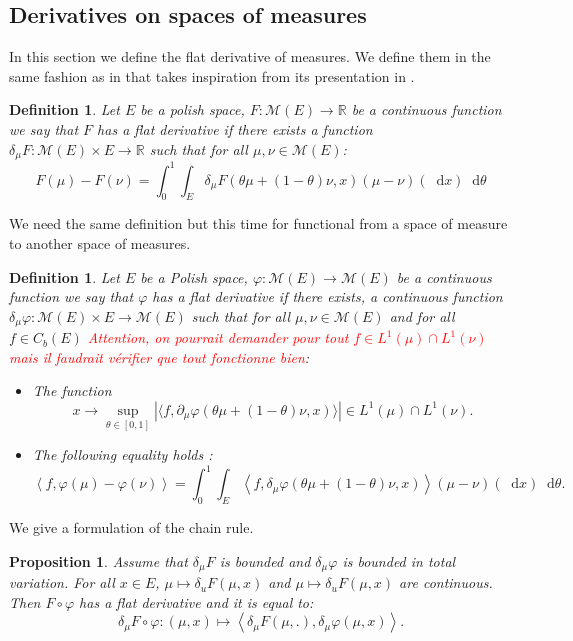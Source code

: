 \documentclass[11pt,a4paper]{article}
\newcommand{\RR}{\mathbb{R}}
\newcommand{\MC}{\mathcal{M}}
\newcommand{\red}[1]{\textcolor{red}{#1}}
\newcommand{\brac}[1]{\left\langle#1\right\rangle}
\newcommand{\dd}{\mathop{}\!\mathrm{d}}
\newtheorem{proposition}[theorem]{Proposition}
\newtheorem{definition}[theorem]{Definition}
\begin{document}
\subsection{Derivatives on spaces of measures}
In this section we define the flat derivative of measures. We define them in the same fashion as in \cite{martiniKolmogorovEquationsSpaces2023} that takes inspiration from its presentation in \cite{cardaliaguet2019master,carmona2018probabilistic}.
\begin{definition}
    Let $E$ be a polish space, $F: \MC(E) \to \RR$ be a continuous function we say that $F$ has a flat derivative if there exists a function $\delta_{\mu}F :\MC(E) \times E\to \RR $ such that for all $\mu,\nu \in \MC(E)$:
    \[ F(\mu) - F(\nu) = \int_0^1 \int_E \delta_\mu F(\theta \mu + (1-\theta)\nu,x)\left(\mu - \nu\right)(\dd x)\dd \theta\]
\end{definition}
We need the same definition but this time for functional from a space of measure to another space of measures.
\begin{definition}
     Let $E$ be a Polish space, $\varphi: \MC(E) \to \MC(E)$ be a continuous function we say that $\varphi$ has a flat derivative if there exists, a continuous function $\delta_{\mu}\varphi :\MC(E) \times E\to \MC(E)$ such that for all $\mu,\nu \in \MC(E)$ and for all $f\in C_b(E)$ \red{Attention, on pourrait demander pour tout $f\in L^1(\mu) \cap L^1(\nu)$ mais il faudrait vérifier que tout fonctionne bien}:
     \begin{itemize}
         \item The function
         \[x\to \sup_{\theta \in [0,1]} |\langle f, \partial_\mu\varphi(\theta \mu + (1-\theta) \nu,x) \rangle| \in L^1(\mu) \cap L^1(\nu).\]
        \item The following equality holds :
            \[ \left\langle f,\varphi(\mu) - \varphi(\nu) \right\rangle= \int_0^1 \int_E \left\langle f,\delta_\mu \varphi(\theta \mu + (1-\theta)\nu,x)\right\rangle\left(\mu - \nu\right)(\dd x)\dd \theta.\]
     \end{itemize}
\end{definition}
We give a formulation of the chain rule.
\begin{proposition}
    Assume that $\delta_\mu F$ is bounded and $\delta_\mu\varphi$ is bounded in total variation. For all \(x\in E\), \(\mu \mapsto \delta_u F(\mu,x)\) and \(\mu \mapsto \delta_u F(\mu,x)\) are continuous. Then \(F\circ \varphi\) has a flat derivative and it is equal to:
    \[
    \delta_\mu F\circ \varphi : \left(\mu,x \right) \mapsto \brac{\delta_\mu  F(\mu,.),\delta_\mu\varphi(\mu,x)}.
    \]
\end{proposition}
\end{document}

